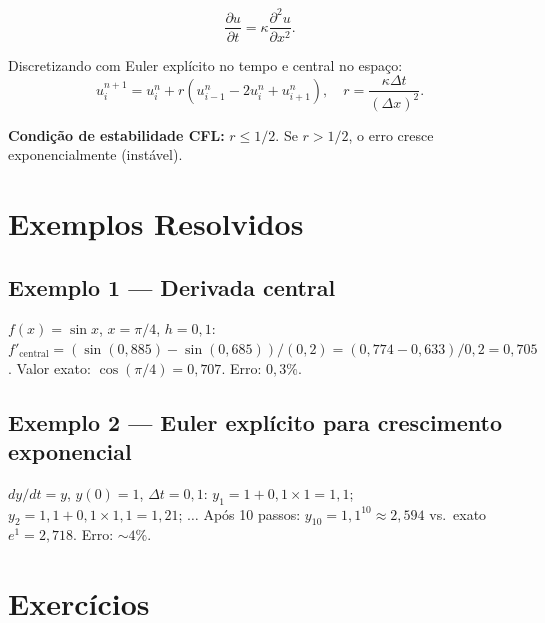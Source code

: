 \documentclass[12pt,a4paper]{article}
\begin{document}
\[
\frac{\partial u}{\partial t} = \kappa\frac{\partial^2 u}{\partial x^2}.
\]

Discretizando com Euler expl\'icito no tempo e central no espa\c{c}o:
\[
u_i^{n+1} = u_i^n + r(u_{i-1}^n - 2u_i^n + u_{i+1}^n), \quad r = \frac{\kappa\Delta t}{(\Delta x)^2}.
\]

\textbf{Condi\c{c}\~ao de estabilidade CFL:} $r \le 1/2$.
Se $r > 1/2$, o erro cresce exponencialmente (inst\'avel).

\section*{Exemplos Resolvidos}

\subsection*{Exemplo 1 --- Derivada central}
$f(x) = \sin x$, $x=\pi/4$, $h=0{,}1$:
$f'_\text{central} = (\sin(0{,}885) - \sin(0{,}685))/(0{,}2) = (0{,}774 - 0{,}633)/0{,}2 = 0{,}705$.
Valor exato: $\cos(\pi/4) = 0{,}707$. Erro: $0{,}3\%$.

\subsection*{Exemplo 2 --- Euler expl\'icito para crescimento exponencial}
$dy/dt = y$, $y(0)=1$, $\Delta t=0{,}1$:
$y_1 = 1 + 0{,}1\times1 = 1{,}1$; $y_2 = 1{,}1+0{,}1\times1{,}1=1{,}21$; $\ldots$
Ap\'os 10 passos: $y_{10} = 1{,}1^{10} \approx 2{,}594$ vs.\ exato $e^1 = 2{,}718$. Erro: $\sim4\%$.

\section*{Exerc\'icios}
\end{document}
